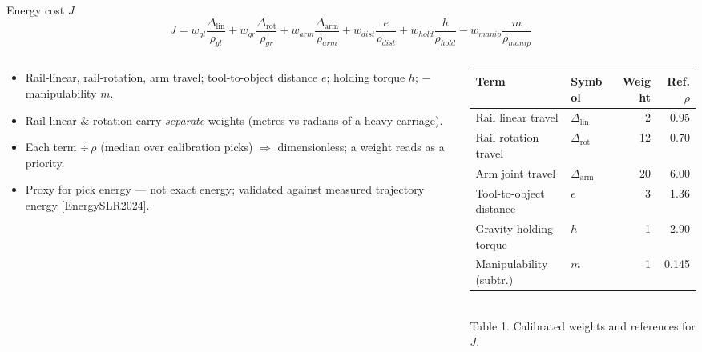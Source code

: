 \documentclass[aspectratio=169]{beamer}
\begin{document}
\begin{frame}{Energy cost $J$}
  \small
  \[
    J = w_{gl}\frac{\Delta_{\mathrm{lin}}}{\rho_{gl}}
      + w_{gr}\frac{\Delta_{\mathrm{rot}}}{\rho_{gr}}
      + w_{arm}\frac{\Delta_{\mathrm{arm}}}{\rho_{arm}}
      + w_{dist}\frac{e}{\rho_{dist}}
      + w_{hold}\frac{h}{\rho_{hold}}
      - w_{manip}\frac{m}{\rho_{manip}}
  \]
  \begin{columns}[T]
    \begin{column}{0.46\textwidth}
      \footnotesize
      \begin{itemize}
        \item Rail-linear, rail-rotation, arm travel; tool-to-object distance $e$;
              holding torque $h$; $-$manipulability $m$.
        \item Rail linear \& rotation carry \emph{separate} weights (metres vs
              radians of a heavy carriage).
        \item Each term $\div\,\rho$ (median over calibration picks) $\Rightarrow$
              dimensionless; a weight reads as a priority.
        \item Proxy for pick energy --- not exact energy; validated against
              measured trajectory energy [EnergySLR2024].
      \end{itemize}
    \end{column}
    \begin{column}{0.54\textwidth}
      \centering
      \scriptsize
      \begin{tabular}{@{}llrr@{}}
        \toprule
        Term & Symbol & Weight & Ref.\ $\rho$ \\
        \midrule
        Rail linear travel      & $\Delta_{\mathrm{lin}}$ & 2  & 0.95  \\
        Rail rotation travel     & $\Delta_{\mathrm{rot}}$ & 12 & 0.70  \\
        Arm joint travel         & $\Delta_{\mathrm{arm}}$ & 20 & 6.00  \\
        Tool-to-object distance  & $e$                     & 3  & 1.36  \\
        Gravity holding torque   & $h$                     & 1  & 2.90  \\
        Manipulability (subtr.)  & $m$                     & 1  & 0.145 \\
        \bottomrule
      \end{tabular}
      \\[3pt]
      {\scriptsize Table 1. Calibrated weights and references for $J$.}
    \end{column}
  \end{columns}
\end{frame}
\end{document}
